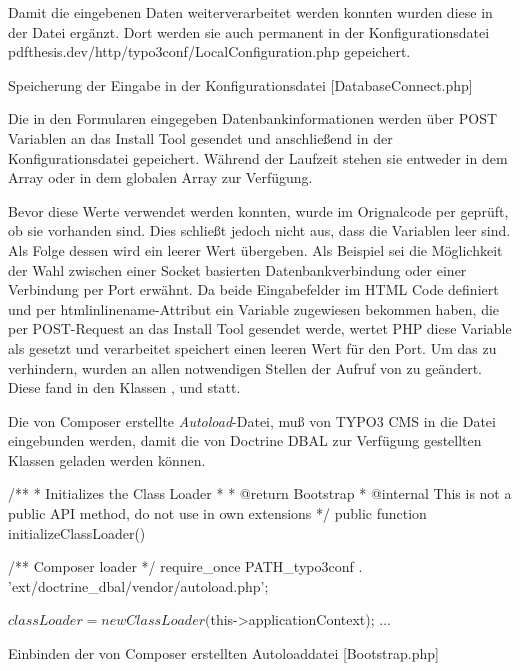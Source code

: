 Damit die eingebenen Daten weiterverarbeitet werden konnten wurden diese in der Datei  ergänzt. Dort werden sie auch permanent in der Konfigurationsdatei pdf{thesis.dev/http/typo3conf/LocalConfiguration.php} gepeichert.

\begin{listing}
\caption{Speicherung der Eingabe in der Konfigurationsdatei [DatabaseConnect.php]}
\end{listing}

Die in den Formularen eingegeben Datenbankinformationen werden über POST Variablen an das Install Tool gesendet und anschließend in der Konfigurationsdatei  gepeichert. Während der Laufzeit stehen sie entweder in dem Array  oder in dem globalen Array  zur Verfügung.


Bevor diese Werte verwendet werden konnten, wurde im Orignalcode per  geprüft, ob sie vorhanden sind. Dies schließt jedoch nicht aus, dass die Variablen leer sind. Als Folge dessen wird ein leerer Wert übergeben. Als Beispiel sei die Möglichkeit der Wahl zwischen einer Socket basierten Datenbankverbindung oder einer Verbindung per Port erwähnt. Da beide Eingabefelder im HTML Code definiert und per htmlinline{name}-Attribut ein Variable zugewiesen bekommen haben, die per POST-Request an das Install Tool gesendet werde, wertet PHP diese Variable als gesetzt und verarbeitet speichert einen leeren Wert für den Port. Um das zu verhindern, wurden an allen notwendigen Stellen der Aufruf von  zu  geändert. Diese fand in den Klassen ,  und  statt.

Die von Composer erstellte \textit{Autoload}-Datei, muß von TYPO3 CMS in die Datei  eingebunden werden, damit die von Doctrine DBAL zur Verfügung gestellten Klassen geladen werden können.

\begin{listing}[H]
\begin{phpcode}
/**
 * Initializes the Class Loader
 *
 * @return Bootstrap
 * @internal This is not a public API method, do not use in own extensions
 */
public function initializeClassLoader() {
	/** Composer loader */
	require_once PATH_typo3conf . 'ext/doctrine_dbal/vendor/autoload.php';

	$classLoader = new ClassLoader($this->applicationContext);
	...
}
\end{phpcode}
\caption{Einbinden der von Composer erstellten Autoloaddatei [Bootstrap.php]}
\label{lst:composerAutoload}
\end{listing}

